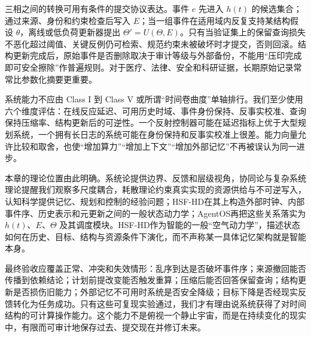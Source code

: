 三相之间的转换可用有条件的提交协议表达。事件 $e$ 先进入 $h(t)$ 的候选集合；通过来源、身份和约束检查后写入 $E$；当一组事件在适用域内反复支持某结构假设 $\theta$，离线或低负荷更新器提出 $\Theta'=U(\Theta,E)$。只有当验证集上的保留查询损失不恶化超过阈值、关键反例仍可检索、规范约束未被破坏时才提交，否则回滚。结构更新完成后，原始事件是否删除取决于审计等级与外部备份，不能用“压印完成即可安全擦除”作普遍规则。对于医疗、法律、安全和科研证据，长期原始记录常常比参数化摘要更重要。

系统能力不应由 Class I 到 Class V 或所谓“时间卷曲度”单轴排行。我们至少使用六个维度评估：在线反应延迟、可用历史时域、事件身份保持、反事实校准、查询保持压缩率、结构更新后的可逆性。一个反射控制器可能在延迟指标上优于大型规划系统，一个拥有长日志的系统可能在身份保持和反事实校准上很差。能力向量允许比较和取舍，也使“增加算力”“增加上下文”“增加外部记忆”不再被误认为同一进步。

本章的理论位置由此明确。系统论提供边界、反馈和层级视角，协同论与复杂系统理论提醒我们观察多尺度耦合，耗散理论约束真实实现的资源供给与不可逆写入，认知科学提供记忆、规划和控制的经验问题；HSF-HD在其上构造外部时钟、内部事件序、历史表示和元更新之间的一般状态动力学；AgentOS再把这些关系落实为 $h(t)$、$E$、$\Theta$ 及其调度模块。HSF-HD作为智能的一般“空气动力学”，描述状态如何在历史、目标、结构与资源条件下演化，而不声称某一具体记忆架构就是智能本身。

最终验收应覆盖正常、冲突和失效情形：乱序到达是否破坏事件序；来源撤回能否传播到依赖结论；计划前提改变能否触发重算；压缩后能否回答保留查询；结构更新是否损伤旧能力；外部记忆不可用时系统是否安全降级；目标下降是否经现实反馈转化为任务成功。只有这些可复现实验通过，我们才有理由说系统获得了对时间结构的可计算操作能力。这个能力不是俯视一个静止宇宙，而是在持续变化的现实中，有限而可审计地保存过去、提交现在并修订未来。

